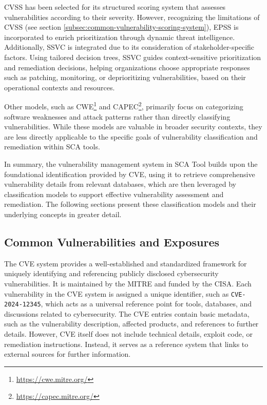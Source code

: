 \ac{CVSS} has been selected for its structured scoring system that assesses vulnerabilities according to their severity. However, recognizing the limitations of \ac{CVSS} (see section \ref{subsec:common-vulnerability-scoring-system}), \ac{EPSS} is incorporated to enrich prioritization through dynamic threat intelligence. Additionally, \ac{SSVC} is integrated due to its consideration of stakeholder-specific factors. Using tailored decision trees, \ac{SSVC} guides context-sensitive prioritization and remediation decisions, helping organizations choose appropriate responses such as patching, monitoring, or deprioritizing vulnerabilities, based on their operational contexts and resources.

Other models, such as \ac{CWE}\footnote{\url{https://cwe.mitre.org/}} and \ac{CAPEC}\footnote{\url{https://capec.mitre.org/}}, primarily focus on categorizing software weaknesses and attack patterns rather than directly classifying vulnerabilities. While these models are valuable in broader security contexts, they are less directly applicable to the specific goals of vulnerability classification and remediation within \ac{SCA} tools.

In summary, the vulnerability management system in \ac{SCA} Tool builds upon the foundational identification provided by \ac{CVE}, using it to retrieve comprehensive vulnerability details from relevant databases, which are then leveraged by classification models to support effective vulnerability assessment and remediation. The following sections present these classification models and their underlying concepts in greater detail.

\subsection{Common Vulnerabilities and Exposures}
\label{subsec:common-vulnerabilities-exposures}

The \ac{CVE} system provides a well-established and standardized framework for uniquely identifying and referencing publicly disclosed cybersecurity vulnerabilities. It is maintained by the \ac{MITRE} and funded by the \ac{CISA}. Each vulnerability in the \ac{CVE} system is assigned a unique identifier, such as \texttt{CVE-2024-12345}, which acts as a universal reference point for tools, databases, and discussions related to cybersecurity. The \ac{CVE} entries contain basic metadata, such as the vulnerability description, affected products, and references to further details. However, \ac{CVE} itself does not include technical details, exploit code, or remediation instructions. Instead, it serves as a reference system that links to external sources for further information.

